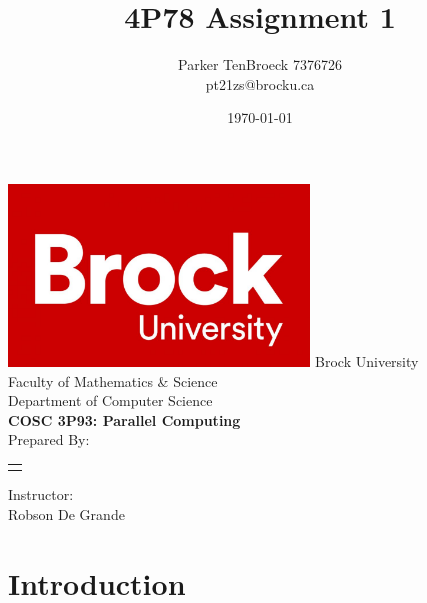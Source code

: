 \documentclass[12pt]{article}
\begin{document}
\title{4P78 Assignment 1}
\author{
    Parker TenBroeck 7376726\\
    pt21zs@brocku.ca
}
\date{\today}

\makeatletter
\begin{titlepage}
	\def \LOGOPATH {brock.jpg}
	\def \UNIVERSITY {Brock University}
	\def \FACULTY {Faculty of Mathematics \& Science}
	\def \DEPARTMENT {Department of Computer Science}
	\def \COURSETITLE {COSC 3P93: Parallel Computing}
	\def \SUPERVISOR {Robson De Grande}
	
	
	\vfill
	\begin{center}
		\includegraphics[width=0.6\textwidth]{brock.jpg}
		\fontsize{14pt}{14pt}\selectfont
		\vfill
		\UNIVERSITY \\
		\FACULTY \\
		\DEPARTMENT \\
		\vfill
		\fontsize{18pt}{18pt}\selectfont
		\textbf{\COURSETITLE} \\[0.5cm]
		\textbf{\@title}
		\vfill
		\fontsize{14pt}{14pt}\selectfont
		Prepared By: \\[0.5cm]
		
		\begin{tabular}[t]{c}
			\@author
		\end{tabular}\par
	
	    \vfill
		Instructor: \\
		\SUPERVISOR
		\vfill
		\@date
	\end{center}
\end{titlepage}
\makeatother

\newpage

\section{Introduction}
\end{document}

